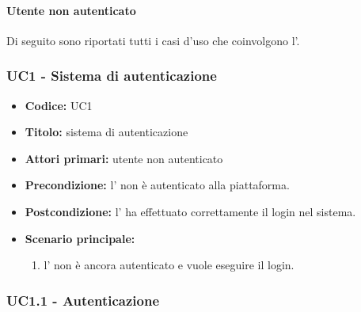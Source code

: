 \documentclass[casi-duso]{subfiles}
\begin{document}
\paragraph{Utente non autenticato}
\label{par:utente-non-autenticato}
Di seguito sono riportati tutti i casi d'uso che coinvolgono l'.

\subsubsection{UC1 - Sistema di autenticazione}
\label{subsub:UC1}






\begin{itemize}
  \item \textbf{Codice:} UC1
  \item \textbf{Titolo:} sistema di autenticazione
  \item \textbf{Attori primari:} utente non autenticato
  \item \textbf{Precondizione:} l' non è autenticato alla piattaforma.
  \item \textbf{Postcondizione:} l' ha effettuato correttamente il login nel sistema.
  \item \textbf{Scenario principale:}
  \begin{enumerate}
    \item l' non è ancora autenticato e vuole eseguire il login.
  \end{enumerate}
\end{itemize}

\subsubsection{UC1.1 - Autenticazione}
\label{subsub:UC1.1}
\end{document}
